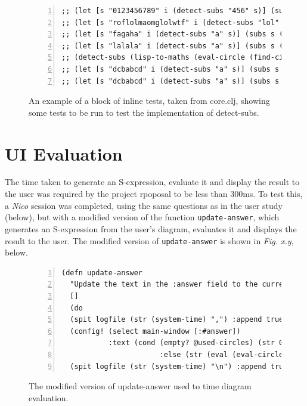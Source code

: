 \documentclass[12pt,twoside,notitlepage,xetex]{report}
\begin{document}
\begin{center}
\begin{figure}[H]
\begin{center}
\begin{minipage}{11.7cm}
\begin{Verbatim}[fontsize=\tiny,numbers=left]
;; (let [s "0123456789" i (detect-subs "456" s)] (subs s (:s (first i)) (:e (first i))))
;; (let [s "roflolmaomglolwtf" i (detect-subs "lol" s)] (subs s (:s (first i)) (:e (first i))))
;; (let [s "fagaha" i (detect-subs "a" s)] (subs s (:s (first i)) (:e (first i))))
;; (let [s "lalala" i (detect-subs "a" s)] (subs s (:s (first i)) (:e (first i))))
;; (detect-subs (lisp-to-maths (eval-circle (find-circle "c0"))) (lisp-to-maths (eval (:q (first @current-qset)))))
;; (let [s "dcbabcd" i (detect-subs "a" s)] (subs s (:s (first i)) (:e (first i))))
;; (let [s "dcbabcd" i (detect-subs "a" s)] (subs s (:s (nth i 1)) (:e (nth i 1))))

\end{Verbatim}
\end{minipage}
\end{center}
\caption{An example of a block of inline tests, taken from {\ttfamily core.clj}, showing some tests to be run to test the implementation of {\ttfamily detect-subs}.}
\end{figure}
\end{center}


\section{UI Evaluation}

The time taken to generate an S-expression, evaluate it and display the result to the user was required by the project rpoposal to be less than 300ms.  To test this, a \emph{Nico} session was completed, using the same questions as in the user study (below), but with a modified version of the function \verb¬update-answer¬, which generates an S-expression from the user's diagram, evaluates it and displays the result to the user.  The modified version of \verb¬update-answer¬ is shown in \emph{Fig. x.y}, below.

\begin{center}
\begin{figure}[H]
\begin{center}
\begin{minipage}{\textwidth-2cm}
\begin{Verbatim}[fontsize=\small,numbers=left]
(defn update-answer
  "Update the text in the :answer field to the current value of the diagram."
  []
  (do
  (spit logfile (str (system-time) ",") :append true) ;; log begin time
  (config! (select main-window [:#answer])
           :text (cond (empty? @used-circles) (str 0)
                       :else (str (eval (eval-circle (find-root))))))
  (spit logfile (str (system-time) "\n") :append true)));; log end time
\end{Verbatim}
\end{minipage}
\end{center}
\caption{The modified version of {\ttfamily update-answer} used to time diagram evaluation.}
\end{figure}
\end{center}
\end{document}
